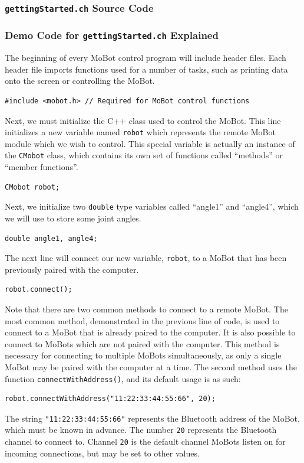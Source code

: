 \documentclass{article}
\begin{document}
\subsubsection{\texttt{gettingStarted.ch} Source Code}


\subsubsection{\label{sec:democode}Demo Code for \texttt{gettingStarted.ch} Explained}
The beginning of every MoBot control program will include header files. Each
header file imports functions used for a number of tasks, such as printing
data onto the screen or controlling the MoBot. 

\begin{verbatim}
#include <mobot.h> // Required for MoBot control functions
\end{verbatim}

Next, we must initialize the C++ class used to control the MoBot. This line
initializes a new variable named \texttt{robot} which represents the remote
MoBot module which we wish to control. This special variable is actually an
instance of the \texttt{CMobot} class, which contains its own set of
functions called ``methods'' or ``member functions''.
\begin{verbatim}
CMobot robot;
\end{verbatim}

Next, we initialize two \texttt{double} type variables called 
``angle1'' and ``angle4'', which we will use to store some joint angles.
\begin{verbatim}
double angle1, angle4;
\end{verbatim}

The next line will connect our new variable, \texttt{robot}, to a
MoBot that has been previously paired with the computer.
\begin{verbatim}
robot.connect();
\end{verbatim}

Note that there are two common methods to connect to a remote MoBot. 
The most common method, demonstrated in the previous line of code, is
used to connect to a MoBot that is already paired to the computer. It
is also possible to connect to MoBots which are not paired with the 
computer. This method is necessary for connecting to multiple
MoBots simultaneously, as only a single MoBot may be paired with the
computer at a time. The second method uses the function
\texttt{connectWithAddress()}, and its default usage is as such:
\begin{verbatim}
robot.connectWithAddress("11:22:33:44:55:66", 20);
\end{verbatim}
The string \texttt{"11:22:33:44:55:66"} represents the Bluetooth address
of the MoBot, which must be known in advance. The number \texttt{20} 
represents the Bluetooth channel to connect to. Channel \texttt{20}
is the default channel MoBots listen on for incoming connections, but
may be set to other values.
\end{document}
